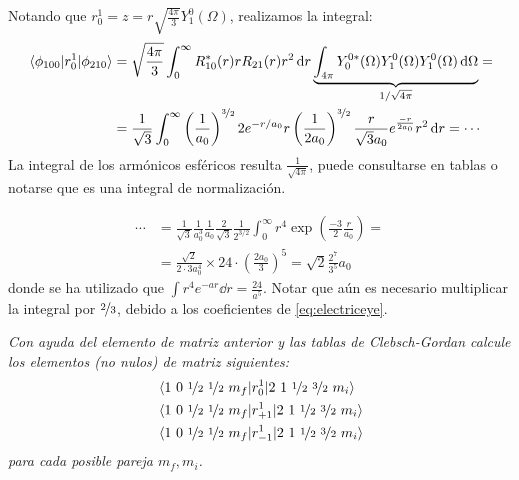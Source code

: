 Notando que $r_0^1=z=r \sqrt{\frac{4\pi}{3}} Y_1^0(\Omega)$,
realizamos la integral:
\begin{equation}
  \begin{split}
    \mel{\phi_{100}}{r_0^1}{\phi_{210}} &= \sqrt{\frac{4\pi}{3}} \int_0^\infty R_{10}^* (r) r
    R_{21}(r) r^2 \dd{r} \underbrace{\int_{4\pi}
    Y_0^{0*}(\Omega)Y_{1}^0(\Omega)Y_1^0(\Omega) \dd{\Omega}}_{1/\sqrt{4\pi}} = \\
    &=\frac{1}{\sqrt{3}} \int_0^\infty \left( \frac{1}{a_0} \right)^{\nicefrac{3}{2}} 2
    e^{-r/a_0} r \left( \frac{1}{2a_0} \right)^{\nicefrac{3}{2}}
    \frac{r}{\sqrt{3}a_0} e^{\frac{-r}{2a_0}} r^2 \dd{r} = \cdots
  \end{split}
\end{equation}
La integral de los armónicos esféricos resulta
$\frac{1}{\sqrt{4\pi}}$, puede consultarse en tablas o notarse que es
una integral de normalización\footnotemark.

\begin{equation}
  \begin{split}
    \cdots &= \frac{1}{\sqrt{3}} \frac{1}{a_0^3} \frac{1}{a_0}
    \frac{2}{\sqrt{3}} \frac{1}{2^{3/2}} \int_0^\infty r^4 \exp \left( \frac{-3}{2}
      \frac{r}{a_0} \right) = \\
    &= \frac{\sqrt{2}}{2\cdot3 a_0^4} \times 24\cdot \left(
      \frac{2a_0}{3} \right)^5 = \sqrt{2} \frac{2^7}{3^5}a_0
  \end{split}
\end{equation}
donde se ha utilizado que $\int r^4 e^{-ar} \dd{r} = \frac{24}{a^5}$. Notar que aún es necesario multiplicar la integral por $\nicefrac{2}{3}$, debido a los coeficientes de \eqref{eq:electriceye}.

\begin{tcolorbox}[halign=left]
  \emph{
    Con ayuda del elemento de matriz anterior y las tablas de
    Clebsch-Gordan calcule los elementos (no nulos) de matriz siguientes:
  }
  \begin{align*}
    &\mel*{1\  0 \ {\nicefrac{1}{2}} \ {\nicefrac{1}{2}} \ {m_f}}{r^1_0}{2\ 1  \ {{\nicefrac{1}{2}}} \      {\nicefrac{3}{2}} \ {m_i}} \\
    &\mel*{1\  0 \ {\nicefrac{1}{2}} \ {\nicefrac{1}{2}} \ {m_f}}{r^1_{+1}}{2\ 1  \ {{\nicefrac{1}{2}}} \      {\nicefrac{3}{2}} \ {m_i}} \\
    &\mel*{1\  0 \ {\nicefrac{1}{2}} \ {\nicefrac{1}{2}} \ {m_f}}{r^1_{-1}}{2\ 1  \ {{\nicefrac{1}{2}}} \      {\nicefrac{3}{2}} \ {m_i}}
  \end{align*}
  \emph{
    para cada posible pareja $m_f,m_i$.
  }
\end{tcolorbox}

